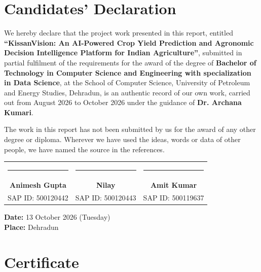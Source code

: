 \documentclass[11pt,a4paper]{report}
\begin{document}
\setcounter{page}{2}

\chapter*{Candidates' Declaration}

We hereby declare that the project work presented in this report, entitled \textbf{``KissanVision: An AI-Powered Crop Yield Prediction and Agronomic Decision Intelligence Platform for Indian Agriculture''}, submitted in partial fulfilment of the requirements for the award of the degree of \textbf{Bachelor of Technology in Computer Science and Engineering with specialization in Data Science}, at the School of Computer Science, University of Petroleum and Energy Studies, Dehradun, is an authentic record of our own work, carried out from August 2026 to October 2026 under the guidance of \textbf{Dr. Archana Kumari}.

The work in this report has not been submitted by us for the award of any other degree or diploma. Wherever we have used the ideas, words or data of other people, we have named the source in the references.\\[25mm]

\noindent
\begin{tabular*}{\textwidth}{@{\extracolsep{\fill}}ccc}
\rule{45mm}{0.5pt} & \rule{45mm}{0.5pt} & \rule{45mm}{0.5pt} \\
\textbf{Animesh Gupta} & \textbf{Nilay} & \textbf{Amit Kumar} \\
SAP ID: 500120442 & SAP ID: 500120443 & SAP ID: 500119637
\end{tabular*}

\vspace{25mm}
\noindent
\textbf{Date:} 13 October 2026 (Tuesday)\\
\textbf{Place:} Dehradun

\newpage

\chapter*{Certificate}
\end{document}

